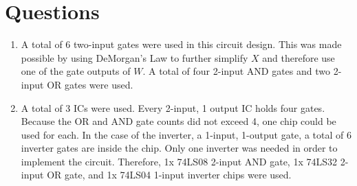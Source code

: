 \documentclass[CMPE]{KGCOEReport}
\begin{document}
\section*{Questions}

\begin{enumerate}
  \item A total of 6 two-input gates were used in this circuit design. This was made possible by using DeMorgan's Law to further simplify $X$ and therefore use one of the gate outputs of $W$. A total of four 2-input AND gates and two 2-input OR gates were used.

  \item A total of 3 ICs were used. Every 2-input, 1 output IC holds four gates. Because the OR and AND gate counts did not exceed 4, one chip could be used for each. In the case of the inverter, a 1-input, 1-output gate, a total of 6 inverter gates are inside the chip. Only one inverter was needed in order to implement the circuit. Therefore, 1x 74LS08 2-input AND gate, 1x 74LS32 2-input OR gate, and 1x 74LS04 1-input inverter chips were used.
\end{enumerate}
\end{document}
